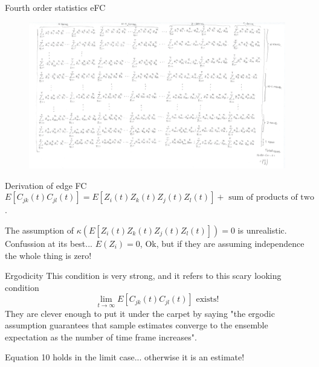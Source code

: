 \documentclass{beamer}
\begin{document}
\begin{frame}{Fourth order statistics eFC}
\begin{figure}[h]
	\centering
		\includegraphics[scale=0.3]{../Figures/fig_novelli_description7.png}
\end{figure}	
\end{frame}

\begin{frame}{Derivation of edge FC}
	\begin{equation}
		E[C_{jk}(t) C_{jl}(t)]= E[Z_i(t)Z_k(t)Z_j(t)Z_l(t)]+ \textrm{ sum of products of two}
	\end{equation}.

The assumption of  $\kappa (E[Z_i(t)Z_k(t)Z_j(t)Z_l(t)])=0$ is unrealistic. Confussion at its best... $E(Z_i)=0$, Ok, but if they are assuming independence the whole thing is zero!
 
\end{frame}

\begin{frame}{Ergodicity }
	This condition is very strong, and it refers to this scary looking condition
	\begin{equation}
		\lim_{t\to \infty} E[C_{jk}(t) C_{jl}(t)] \textrm{ exists!}
	\end{equation}
They are clever enough to put it under the carpet by saying
"the ergodic assumption guarantees that sample estimates converge to the ensemble expectation as the number of time frame increases". 

Equation 10 holds  in the limit case... otherwise it is an estimate!

\end{frame}
		
\end{document}
